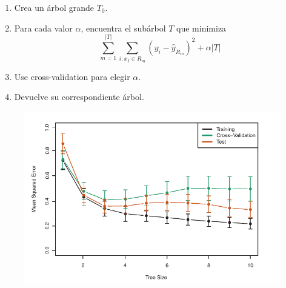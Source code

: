 \documentclass{beamer}
\theoremstyle{definition}
\begin{document}
\begin{frame}
\begin{enumerate}
	\item<1-> Crea un árbol grande $T_0$.
	\item<2-> Para cada valor $\alpha$, encuentra el subárbol $T$ que minimiza
	\[ \sum_{m=1}^{|T|} \sum_{i\colon x_I \in R_m} (y_i - \widehat{y}_{R_m})^2 + \alpha|T| \]
	\item<3-> Use cross-validation para elegir $\alpha$.
	\item<4-> Devuelve su correspondiente árbol.
\end{enumerate}
\end{frame}

\begin{frame}
\begin{figure}[h!]
\includegraphics[scale=0.4]{prunning}
\end{figure}
\end{frame}
\end{document}
